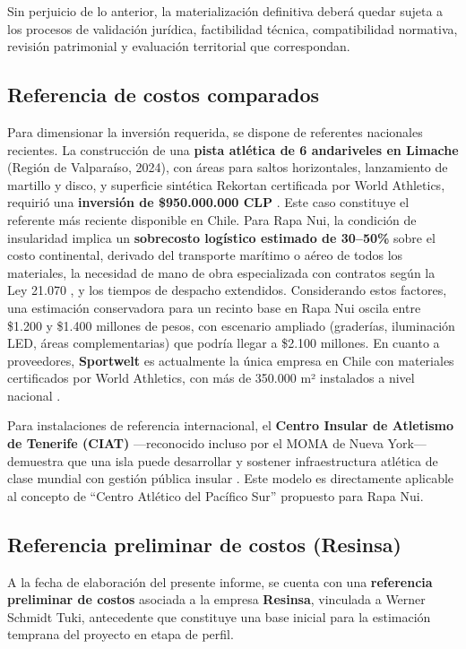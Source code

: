 \documentclass[12pt, a4paper]{article}
\begin{document}
Sin perjuicio de lo anterior, la materialización definitiva deberá quedar sujeta
a los procesos de validación jurídica, factibilidad técnica, compatibilidad
normativa, revisión patrimonial y evaluación territorial que correspondan.

\subsection{Referencia de costos comparados}

Para dimensionar la inversión requerida, se dispone de referentes nacionales recientes.
La construcción de una \textbf{pista atlética de 6 andariveles en Limache} (Región de
Valparaíso, 2024), con áreas para saltos horizontales, lanzamiento de martillo y disco,
y superficie sintética Rekortan certificada por World Athletics, requirió una
\textbf{inversión de \$950.000.000 CLP} \citep{PistaLimache2024}. Este caso constituye
el referente más reciente disponible en Chile. Para Rapa Nui, la condición de
insularidad implica un \textbf{sobrecosto logístico estimado de 30--50\%} sobre el
costo continental, derivado del transporte marítimo o aéreo de todos los materiales,
la necesidad de mano de obra especializada con contratos según la Ley
21.070 \citep{Ley21070}, y los tiempos de despacho extendidos. Considerando estos
factores, una estimación conservadora para un recinto base en Rapa Nui
oscila entre \$1.200 y \$1.400 millones de pesos, con escenario ampliado
(graderías, iluminación LED, áreas complementarias) que podría llegar a \$2.100
millones. En cuanto a proveedores, \textbf{Sportwelt} es actualmente la única empresa
en Chile con materiales certificados por World Athletics, con más de 350.000 m²
instalados a nivel nacional \citep{Sportwelt2024}.

Para instalaciones de referencia internacional, el \textbf{Centro Insular de Atletismo
de Tenerife (CIAT)} ---reconocido incluso por el MOMA de Nueva York--- demuestra
que una isla puede desarrollar y sostener infraestructura atlética de clase mundial
con gestión pública insular \citep{CIATTenerife}. Este modelo es directamente
aplicable al concepto de ``Centro Atlético del Pacífico Sur'' propuesto para
Rapa Nui.

\subsection{Referencia preliminar de costos (Resinsa)}

A la fecha de elaboración del presente informe, se cuenta con una
\textbf{referencia preliminar de costos} asociada a la empresa \textbf{Resinsa},
vinculada a Werner Schmidt Tuki, antecedente que constituye una base inicial
para la estimación temprana del proyecto en etapa de perfil.
\end{document}
